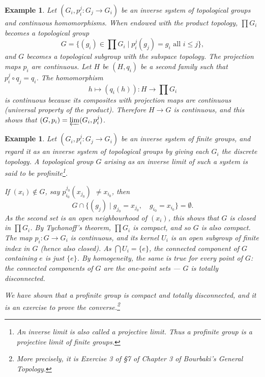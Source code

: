 \documentclass[a4paper,11pt,final,openany]{memoir}
\newtheorem{example}[X]{Example}
\theoremstyle{nonumberplain}
\begin{document}
\begin{example}
\label{ig15}Let $(G_{i},p_{i}^{j}\colon G_{j}\rightarrow G_{i})$ be an inverse
system of topological groups and continuous homomorphisms. When endowed with
the product topology, $\prod G_{i}$ becomes a topological group
\[
G=\{(g_{i})\in\prod G_{i}\mid p_{i}^{j}(g_{j})=g_{i}\text{ all }i\leq j\},
\]
and $G$ becomes a topological subgroup with the subspace topology. The
projection maps $p_{i}$ are continuous. Let $H$ be $(H,q_{i})$ be a second
family such that $p_{i}^{j}\circ q_{j}=q_{i}$. The homomorphism
\[
h\mapsto(q_{i}(h))\colon H\rightarrow\prod G_{i}%
\]
is continuous because its composites with projection maps are continuous
(universal property of the product). Therefore $H\rightarrow G$ is continuous,
and this shows that $(G,p_{i})=\varprojlim(G_{i},p_{i}^{j})$.
\end{example}

\begin{example}
\label{ig16}Let $(G_{i},p_{i}^{j}\colon G_{j}\rightarrow G_{i})$ be an inverse
system of finite groups, and regard it as an inverse system of topological
groups by giving each $G_{i}$ the discrete topology. A topological group $G$
arising as an inverse limit of such a system is said to be%
\emph{profinite}\footnote{An inverse limit is also called a projective limit.
Thus a profinite group is a projective limit of finite groups.}$.$

If $(x_{i})\notin G$, say $p_{i_{0}}^{j_{0}}(x_{j_{0}})$ $\neq x_{i_{0}}$,
then%
\[
G\cap\{(g_{j})\mid g_{j_{0}}=x_{j_{0}},\quad g_{i_{0}}=x_{i_{0}}%
\}=\emptyset\text{.}%
\]
As the second set is an open neighbourhood of $(x_{i})$, this shows that $G$
is closed in $%
{\textstyle\prod}
G_{i}$. By Tychonoff's theorem, $%
{\textstyle\prod}
G_{i}$ is compact, and so $G$ is also compact. The map $p_{i}\colon
G\rightarrow G_{i}$ is continuous, and its kernel $U_{i}$ is an open subgroup
of finite index in $G$ (hence also closed). As $\bigcap U_{i}=\{e\}$, the
connected component of $G$ containing $e$ is just $\{e\}$. By homogeneity, the
same is true for every point of $G$: the connected components of $G$ are the
one-point sets --- $G$ is totally disconnected.

We have shown that a profinite group is compact and totally disconnected, and
it is an exercise to prove the converse.\footnote{More precisely, it is
Exercise 3 of \S 7 of Chapter 3 of Bourbaki's General Topology.}
\end{example}
\end{document}
